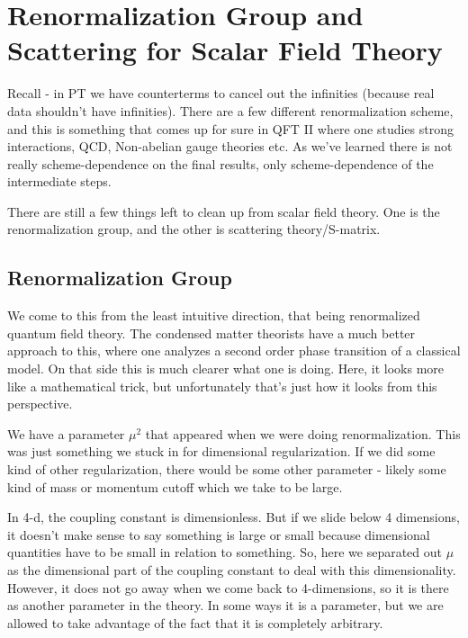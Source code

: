 \section{Renormalization Group and Scattering for Scalar Field Theory}
Recall - in PT we have counterterms to cancel out the infinities (because real data shouldn't have infinities). There are a few different renormalization scheme, and this is something that comes up for sure in QFT II where one studies strong interactions, QCD, Non-abelian gauge theories etc. As we've learned there is not really scheme-dependence on the final results, only scheme-dependence of the intermediate steps.

There are still a few things left to clean up from scalar field theory. One is the renormalization group, and the other is scattering theory/S-matrix.

\subsection{Renormalization Group}
We come to this from the least intuitive direction, that being renormalized quantum field theory. The condensed matter theorists have a much better approach to this, where one analyzes a second order phase transition of a classical model. On that side this is much clearer what one is doing. Here, it looks more like a mathematical trick, but unfortunately that's just how it looks from this perspective.

We have a parameter $\mu^2$ that appeared when we were doing renormalization. This was just something we stuck in for dimensional regularization. If we did some kind of other regularization, there would be some other parameter - likely some kind of mass or momentum cutoff which we take to be large. 

In 4-d, the coupling constant is dimensionless. But if we slide below 4 dimensions, it doesn't make sense to say something is large or small because dimensional quantities have to be small in relation to something. So, here we separated out $\mu$ as the dimensional part of the coupling constant to deal with this dimensionality. However, it does not go away when we come back to 4-dimensions, so it is there as another parameter in the theory. In some ways it is a parameter, but we are allowed to take advantage of the fact that it is completely arbitrary.

